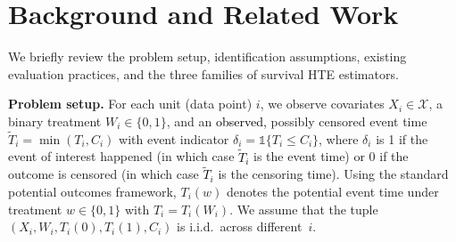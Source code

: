 \documentclass{article} %
\newcommand{\ind}{\mathds{1}}
\newcommand{\rebuttal}[1]{\textcolor{black}{#1}}
\begin{document}
\vspace{-.7em}
\section{Background and Related Work}
\label{sec:background}
\vspace{-.7em}
We briefly review the problem setup, identification assumptions, existing evaluation practices, and the three families of survival HTE estimators.


\textbf{Problem setup.}
For each unit (data point) $i$, we observe covariates $X_i \in \mathcal{X}$, a binary treatment ${W_i \in \{0,1\}}$, and an \rebuttal{observed,} possibly censored event time $\widetilde{T}_i = \min(T_i, C_i)$ with event indicator $\delta_i = {\ind\{T_i \leq C_i\}}$, where $\delta_i$ is 1 if the event of interest happened (in which case \rebuttal{$\widetilde{T}_i$} is the event time) or 0 if the outcome is censored (in which case \rebuttal{$\widetilde{T}_i$} is the censoring time). Using the standard potential outcomes framework, $T_i(w)$ denotes the potential event time under treatment $w\in\{0,1\}$ with $T_i=T_i(W_i)$.
We assume that the tuple $(X_i,W_i,T_i(0),T_i(1),C_i)$ is i.i.d.~across different~$i$.
\end{document}
